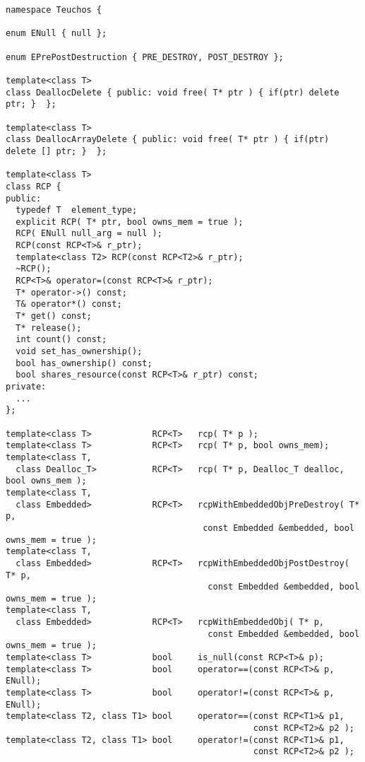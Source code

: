 \documentclass[pdf,ps2pdf,11pt]{SANDreport}
\begin{document}
{\scriptsize\begin{verbatim}
namespace Teuchos {

enum ENull { null };

enum EPrePostDestruction { PRE_DESTROY, POST_DESTROY };

template<class T>
class DeallocDelete { public: void free( T* ptr ) { if(ptr) delete ptr; }  };

template<class T>
class DeallocArrayDelete { public: void free( T* ptr ) { if(ptr) delete [] ptr; }  };

template<class T>
class RCP {
public:
  typedef T  element_type;
  explicit RCP( T* ptr, bool owns_mem = true );
  RCP( ENull null_arg = null );
  RCP(const RCP<T>& r_ptr);
  template<class T2> RCP(const RCP<T2>& r_ptr);
  ~RCP();
  RCP<T>& operator=(const RCP<T>& r_ptr);
  T* operator->() const;
  T& operator*() const;
  T* get() const;
  T* release();
  int count() const;
  void set_has_ownership();
  bool has_ownership() const;
  bool shares_resource(const RCP<T>& r_ptr) const;
private:
  ...
};

template<class T>            RCP<T>   rcp( T* p );
template<class T>            RCP<T>   rcp( T* p, bool owns_mem);
template<class T,
  class Dealloc_T>           RCP<T>   rcp( T* p, Dealloc_T dealloc, bool owns_mem );
template<class T,
  class Embedded>            RCP<T>   rcpWithEmbeddedObjPreDestroy( T* p,
                                       const Embedded &embedded, bool owns_mem = true );
template<class T,
  class Embedded>            RCP<T>   rcpWithEmbeddedObjPostDestroy( T* p,
                                        const Embedded &embedded, bool owns_mem = true );
template<class T,
  class Embedded>            RCP<T>   rcpWithEmbeddedObj( T* p,
                                        const Embedded &embedded, bool owns_mem = true );
template<class T>            bool     is_null(const RCP<T>& p);
template<class T>            bool     operator==(const RCP<T>& p, ENull);
template<class T>            bool     operator!=(const RCP<T>& p, ENull);
template<class T2, class T1> bool     operator==(const RCP<T1>& p1,
                                                 const RCP<T2>& p2 );
template<class T2, class T1> bool     operator!=(const RCP<T1>& p1,
                                                 const RCP<T2>& p2 );
\end{verbatim}}
\pagebreak
\end{document}
